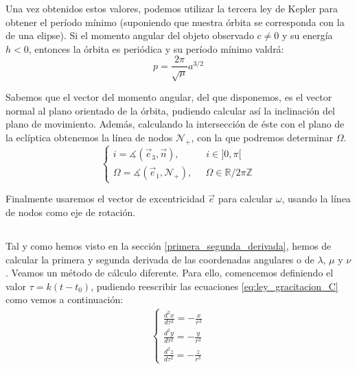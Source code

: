 \documentclass[11pt]{article}
\begin{document}
Una vez obtenidos estos valores, podemos utilizar la tercera ley de Kepler para obtener el período mínimo (suponiendo que nuestra órbita se corresponda con la de una elipse). Si el momento angular del objeto observado $c\neq0$ y su energía $h<0$, entonces la órbita es periódica y su período mínimo valdrá:
\[
p=\frac{2\pi}{\sqrt{\mu}}a^{3/2}
\]

Sabemos que el vector del momento angular, del que disponemos, es el vector normal al plano orientado de la órbita, pudiendo calcular así la inclinación del plano de movimiento. Además, calculando la intersección de éste con el plano de la eclíptica obtenemos la línea de nodos $\mathcal{N}_+$, con la que podremos determinar $\Omega$.
\[
\left\{
\begin{array}{l}
	i=\measuredangle(\vec{e}_3,\vec{n}), \; \; \; \; \; \; \; \; \; \; i\in]0,\pi[\\
	\Omega=\measuredangle(\vec{e}_1, \mathcal{N}_+), \; \; \; \; \; \Omega\in\mathbb{R}/2\pi\mathbb{Z}
\end{array}
\right.
\]

Finalmente usaremos el vector de excentricidad $\vec{e}$ para calcular $\omega$, usando la línea de nodos como eje de rotación.\\

\subsection{}

Tal y como hemos visto en la sección \ref{primera_segunda_derivada}, hemos de calcular la primera y segunda derivada de las coordenadas angulares o de $\lambda$, $\mu$ y $\nu$. Veamos un método de cálculo diferente. Para ello, comencemos definiendo el valor $\tau=k(t-t_0)$, pudiendo reescribir las ecuaciones \ref{eq:ley_gracitacion_C} como vemos a continuación:
\begin{align}
\left\{
\begin{array}{l}
	\frac{d^2x}{d\tau^2}=-\frac{x}{r^3}\\
	\frac{d^2y}{d\tau^2}=-\frac{y}{r^3}\\
	\frac{d^2z}{d\tau^2}=-\frac{z}{r^3}
\end{array}
\right.
\label{eq:ley_gracitacion_C_2}
\end{align}
\end{document}
